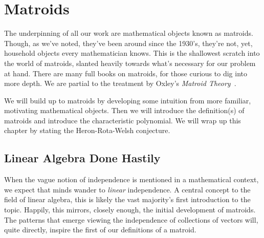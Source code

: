 \documentclass[12pt,oneside]{../../sfsuthesis}
\begin{document}
\chapter{Matroids}

The underpinning of all our work are mathematical objects known as matroids.
Though, as we've noted, they've been around since the 1930's, they're not, yet, household objects every mathematician knows.
This is the shallowest scratch into the world of matroids, slanted heavily towards what's necessary for our problem at hand.
There are many full books on matroids, for those curious to dig into more depth.
We are partial to the treatment by Oxley's \textit{Matroid Theory}~\cite{oxleyMatroidTheory2011}.

We will build up to matroids by developing some intuition from more familiar, motivating mathematical objects.
Then we will introduce the definition(s) of matroids and introduce the characteristic polynomial.
We will wrap up this chapter by stating the Heron-Rota-Welsh conjecture.

\section{Linear Algebra Done Hastily}

When the vague notion of independence is mentioned in a mathematical context, we expect that minds wander to \emph{linear} independence.
A central concept to the field of linear algebra, this is likely the vast majority's first introduction to the topic.
Happily, this mirrors, closely enough, the initial development of matroids.
The patterns that emerge viewing the independence of collections of vectors will, quite directly, inspire the first of our definitions of a matroid.
\end{document}
